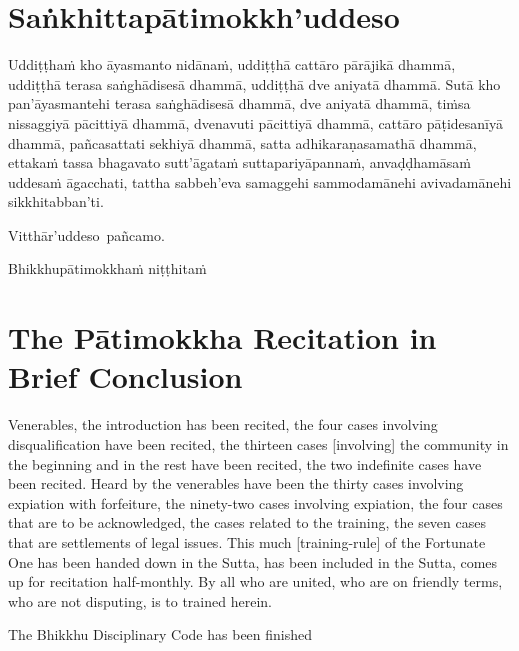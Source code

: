 \section{Saṅkhittapātimokkh'uddeso}
\label{sankhittapatimokkh'uddeso}
Uddiṭṭhaṁ kho āyasmanto nidānaṁ, uddiṭṭhā cattāro pārājikā dhammā, uddiṭṭhā terasa saṅghādisesā dhammā, uddiṭṭhā dve aniyatā dhammā. Sutā kho pan'āyasmantehi terasa saṅghādisesā dhammā, dve aniyatā dhammā, tiṁsa nissaggiyā pācittiyā dhammā, dvenavuti pācittiyā dhammā, cattāro pāṭidesanīyā dhammā, pañcasattati sekhiyā dhammā, satta adhikaraṇasamathā dhammā, ettakaṁ tassa bhagavato sutt'āgataṁ suttapariyāpannaṁ, anvaḍḍhamāsaṁ uddesaṁ āgacchati, tattha sabbeh'eva samaggehi sammodamānehi avivadamānehi sikkhitabban'ti.

Vitthār'uddeso pañcamo.

\begin{outro}
Bhikkhupātimokkhaṁ niṭṭhitaṁ
\end{outro}

\clearpage

\section{The Pātimokkha Recitation in Brief Conclusion}
\label{patimokkha-in-brief-conclusion}

Venerables, the introduction has been recited, the four cases involving disqualification have been recited, the thirteen cases [involving] the community in the beginning and in the rest have been recited, the two indefinite cases have been recited. Heard by the venerables have been the thirty cases involving expiation with forfeiture, the ninety-two cases involving expiation, the four cases that are to be acknowledged, the cases related to the training, the seven cases that are settlements of legal issues. This much [training-rule] of the Fortunate One has been handed down in the Sutta, has been included in the Sutta, comes up for recitation half-monthly. By all who are united, who are on friendly terms, who are not disputing, is to trained herein.

\begin{outro}
  The Bhikkhu Disciplinary Code has been finished
\end{outro}

\clearpage
